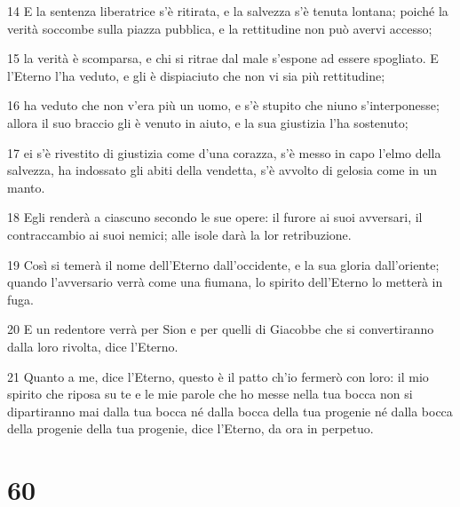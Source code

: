 \par 14 E la sentenza liberatrice s'è ritirata, e la salvezza s'è tenuta lontana; poiché la verità soccombe sulla piazza pubblica, e la rettitudine non può avervi accesso;
\par 15 la verità è scomparsa, e chi si ritrae dal male s'espone ad essere spogliato. E l'Eterno l'ha veduto, e gli è dispiaciuto che non vi sia più rettitudine;
\par 16 ha veduto che non v'era più un uomo, e s'è stupito che niuno s'interponesse; allora il suo braccio gli è venuto in aiuto, e la sua giustizia l'ha sostenuto;
\par 17 ei s'è rivestito di giustizia come d'una corazza, s'è messo in capo l'elmo della salvezza, ha indossato gli abiti della vendetta, s'è avvolto di gelosia come in un manto.
\par 18 Egli renderà a ciascuno secondo le sue opere: il furore ai suoi avversari, il contraccambio ai suoi nemici; alle isole darà la lor retribuzione.
\par 19 Così si temerà il nome dell'Eterno dall'occidente, e la sua gloria dall'oriente; quando l'avversario verrà come una fiumana, lo spirito dell'Eterno lo metterà in fuga.
\par 20 E un redentore verrà per Sion e per quelli di Giacobbe che si convertiranno dalla loro rivolta, dice l'Eterno.
\par 21 Quanto a me, dice l'Eterno, questo è il patto ch'io fermerò con loro: il mio spirito che riposa su te e le mie parole che ho messe nella tua bocca non si dipartiranno mai dalla tua bocca né dalla bocca della tua progenie né dalla bocca della progenie della tua progenie, dice l'Eterno, da ora in perpetuo.

\chapter{60}

